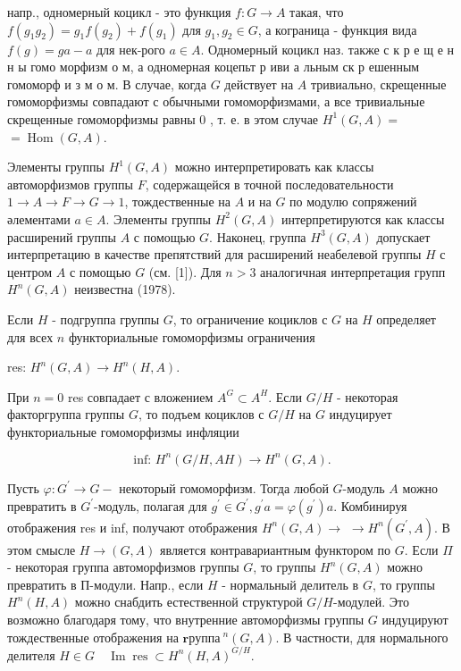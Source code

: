 \documentclass[10pt]{article}
\begin{document}
напр., одномерный коцикл - это функция $f: G \rightarrow A$ такая, что $f\left(g_{1} g_{2}\right)=g_{1} f\left(g_{2}\right)+f\left(g_{1}\right)$ для $g_{1}, g_{2} \in G$, а кограница - функция вида $f(g)=g a-a$ для нек-рого $a \in A$. Одномерный коцикл наз. также с к р е щ е н н ы гомо морфизм о м, а одномерная коцепьт р иви а льным ск р ешенным гомоморф и з м о м. В случае, когда $G$ действует на $A$ тривиально, скрещенные гомоморфизмы совпадают с обычными гомоморфизмами, а все тривиальные скрещенные гомоморфизмы равны 0 , т. е. в этом случае $H^{1}(G, A)=$ $=\operatorname{Hom}(G, A)$.



Элементы группы $H^{1}(G, A)$ можно интерпретировать как классы автоморфизмов группы $F$, содержащейся в точной последовательности $1 \rightarrow A \rightarrow F \rightarrow G \rightarrow 1$, тождественные на $A$ и на $G$ по модулю сопряжений әлементами $a \in A$. Элементы группы $H^{2}(G, A)$ интерпретируются как классы расширений группы $A$ с помощью $G$. Наконец, группа $H^{3}(G, A)$ допускает интерпретацию в качестве препятствий для расширений неабелевой группы $H$ с центром $A$ с помощью $G$ (см. [1]). Для $n>3$ аналогичная интерпретация групп $H^{n}(G, A)$ неизвестна (1978).



Если $H$ - подгруппа группы $G$, то ограничение коциклов с $G$ на $H$ определяет для всех $n$ функториальные гомоморфизмы ограничения



res: $H^{n}(G, A) \longrightarrow H^{n}(H, A)$.



При $n=0$ res совпадает с вложением $A^{G} \subset A^{H}$. Если $G / H$ - некоторая факторгруппа группы $G$, то подъем коциклов с $G / H$ на $G$ индуцирует функториальные гомоморфизмы инфляции



\[

\text { inf: } H^{n}(G / H, A H) \longrightarrow H^{n}(G, A) \text {. }

\]



Пусть $\varphi: G^{\prime} \rightarrow G-$ некоторый гомоморфизм. Тогда любой $G$-модуль $A$ можно превратить в $G^{\prime}$-модуль, полагая для $g^{\prime} \in G^{\prime}, g^{\prime} a=\varphi\left(g^{\prime}\right) a$. Комбинируя отображения res и inf, получают отображения $H^{n}(G, A) \rightarrow$ $\rightarrow H^{n}\left(G^{\prime}, A\right)$. В этом смысле $H \rightarrow(G, A)$ является контравариантным функтором по $G$. Если $\Pi$ - некоторая группа автоморфизмов группы $G$, то группы $H^{n}(G, A)$ можно превратить в П-модули. Напр., если $H$ - нормальный делитель в $G$, то группы $H^{n}(H, A)$ можно снабдить естественной структурой $G / H$-модулей. Это возможно благодаря тому, что внутренние автоморфизмы группы $G$ индуцируют тождественные отображения на $\boldsymbol{r р у п п а ~}^{n}(G, A)$. В частности, для нормального делителя $H \in G \quad \operatorname{Im} \operatorname{res} \subset H^{n}(H, A)^{G / H}$.
\end{document}
